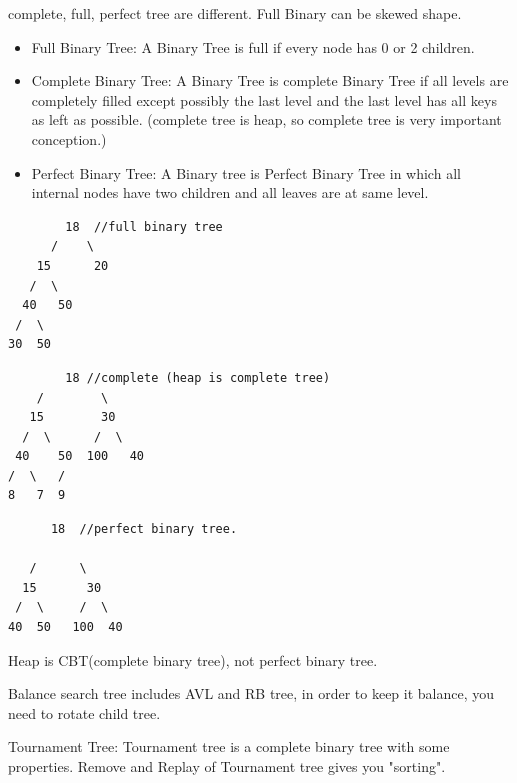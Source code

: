 \documentclass[a4paper,11pt,twoside]{book}
\begin{document}
	\par complete, full, perfect tree are different. Full Binary can be skewed shape. 
	
\begin{itemize}
	\item Full Binary Tree: A Binary Tree is full if every node has 0 or 2 children. 
	
	
	\item Complete Binary Tree: A Binary Tree is complete Binary Tree if all levels are completely filled except possibly the last level and the last level has all keys as left as possible. (complete tree is heap, so complete tree is very important conception.)
	
	\item Perfect Binary Tree: A Binary tree is Perfect Binary Tree in which all internal nodes have two children and all leaves are at same level.
\end{itemize}

\begin{minipage}{.5\textwidth}	
\begin{verbatim}
        18  //full binary tree
      /    \   
    15      20    
   /  \       
  40   50   
 /  \
30  50
\end{verbatim}
\end{minipage}
\begin{minipage}{.5\textwidth}	
\begin{verbatim}	
        18 //complete (heap is complete tree)   
    /        \  
   15        30  
  /  \      /  \
 40    50  100   40
/  \   /
8   7  9 
\end{verbatim}
\end{minipage}
	
\begin{verbatim}	
      18  //perfect binary tree.
      
   /      \  
  15       30  
 /  \     /  \
40  50   100  40
\end{verbatim}


	\par Heap is CBT(complete binary tree), not perfect binary tree. 

	\par Balance search tree includes AVL and RB tree, in order to keep it balance, you need to rotate child tree. 

	\par Tournament Tree: Tournament tree is a complete binary tree with some properties. Remove and  Replay of Tournament tree gives you "sorting". 
\end{document}
